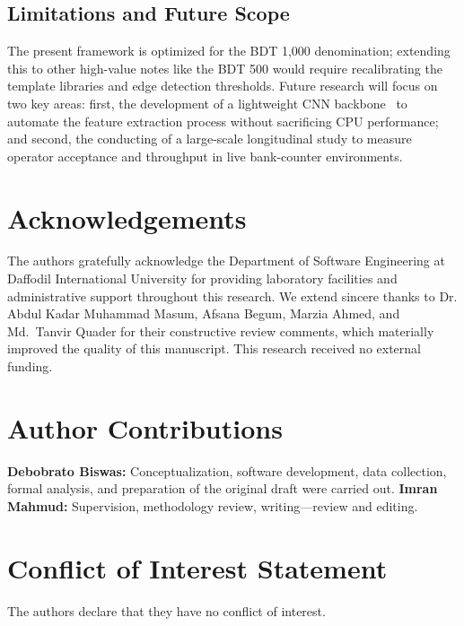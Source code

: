 \documentclass[10pt,a4paper,twocolumn,twoside]{article}
\begin{document}
\subsection{Limitations and Future Scope}

The present framework is optimized for the BDT 1,000 denomination; extending this to other high-value notes like the BDT 500 would require recalibrating the template libraries and edge detection thresholds. Future research will focus on two key areas: first, the development of a lightweight CNN backbone~\cite{sandler2018mobilenetv2} to automate the feature extraction process without sacrificing CPU performance; and second, the conducting of a large-scale longitudinal study to measure operator acceptance and throughput in live bank-counter environments.

\section*{Acknowledgements}

The authors gratefully acknowledge the Department of Software Engineering at Daffodil International University for providing laboratory facilities and administrative support throughout this research. We extend sincere thanks to Dr. Abdul Kadar Muhammad Masum, Afsana Begum, Marzia Ahmed, and Md.~Tanvir Quader for their constructive review comments, which materially improved the quality of this manuscript. This research received no external funding.


\section*{Author Contributions}

\noindent
\textbf{Debobrato Biswas:} Conceptualization, software development, data collection, formal analysis, and preparation of the original draft were carried out.
\textbf{Imran Mahmud:} Supervision, methodology review,
writing---review and editing.

\section*{Conflict of Interest Statement}

The authors declare that they have no conflict of interest.
\end{document}
